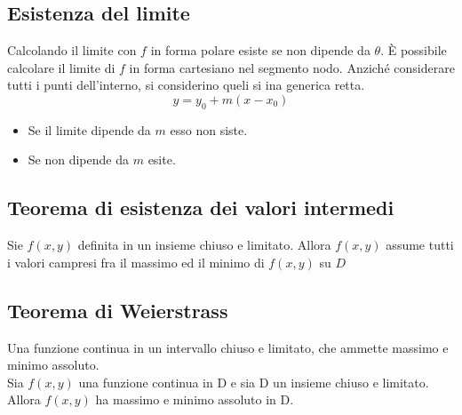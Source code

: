 \subsection{Esistenza del limite}
\begin{defi}
  Calcolando il limite con $f$ in forma polare esiste se non dipende da $\theta$. È possibile calcolare il
  limite di $f$ in forma cartesiano nel segmento nodo. Anziché considerare tutti i punti dell'interno, si
  considerino queli si ina generica retta.
  \begin{equation}
    y=y_0+m(x-x_0)
  \end{equation}
  \begin{itemize}
    \item Se il limite dipende da $m$ esso {\color{red} non siste}.
    \item Se non dipende da $m$ {\color{red}esite}.
  \end{itemize}  
\end{defi}
\subsection{Teorema di esistenza dei valori intermedi}
\begin{teorema}
  Sie $f(x,y)$ definita in un insieme chiuso e limitato. Allora $f(x,y)$ assume tutti i valori campresi fra
  il massimo ed il minimo di $f(x,y)$ su $D$
\end{teorema}
\subsection{Teorema di Weierstrass}
\begin{teorema}
  Una funzione continua in un intervallo chiuso e limitato, che ammette massimo e minimo assoluto.\\
  Sia $f(x,y)$ una funzione continua in D e sia D un insieme chiuso e limitato. Allora $f(x,y)$ ha
  massimo e minimo assoluto in D.
\end{teorema}
